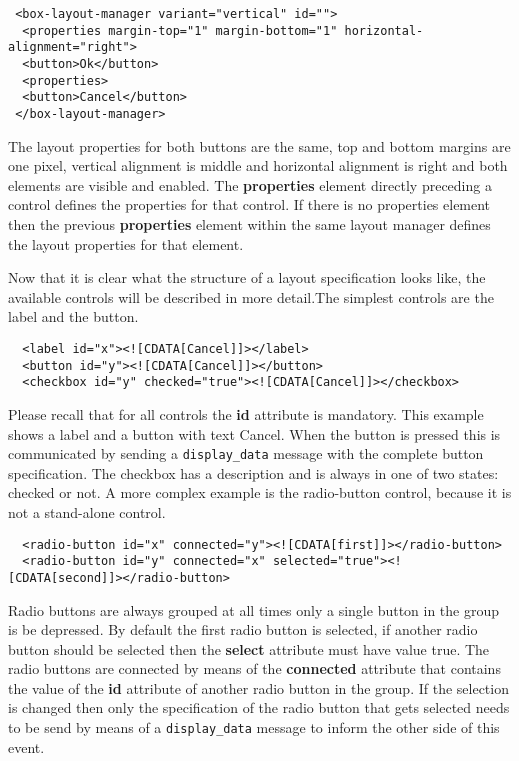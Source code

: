 \documentclass{article}
\newcommand{\msg}[1]{\texttt{#1}}
\begin{document}
    \begin{verbatim}
 <box-layout-manager variant="vertical" id="">
  <properties margin-top="1" margin-bottom="1" horizontal-alignment="right">
  <button>Ok</button>
  <properties>
  <button>Cancel</button>
 </box-layout-manager>\end{verbatim}

   The layout properties for both buttons are the same, top and bottom margins
   are one pixel, vertical alignment is middle and horizontal alignment is right
   and both elements are visible and enabled. The \textbf{properties} element
   directly preceding a control defines the properties for that control. If
   there is no properties element then the previous \textbf{properties} element
   within the same layout manager defines the layout properties for that
   element.

   Now that it is clear what the structure of a layout specification looks
   like, the available controls will be described in more detail.The simplest
   controls are the label and the button.

    \begin{verbatim}
  <label id="x"><![CDATA[Cancel]]></label>
  <button id="y"><![CDATA[Cancel]]></button>
  <checkbox id="y" checked="true"><![CDATA[Cancel]]></checkbox>\end{verbatim}

   Please recall that for all controls the \textbf{id} attribute is mandatory.
   This example shows a label and a button with text Cancel. When the button is
   pressed this is communicated by sending a \msg{display\_data} message with the
   complete button specification. The checkbox has a description and is always
   in one of two states: checked or not. A more complex example is the
   radio-button control, because it is not a stand-alone control.

    \begin{verbatim}
  <radio-button id="x" connected="y"><![CDATA[first]]></radio-button>
  <radio-button id="y" connected="x" selected="true"><![CDATA[second]]></radio-button>\end{verbatim}

   Radio buttons are always grouped at all times only a single button in the
   group is be depressed.  By default the first radio button is selected, if
   another radio button should be selected then the \textbf{select} attribute
   must have value true. The radio buttons are connected by means of the
   \textbf{connected} attribute that contains the value of the \textbf{id}
   attribute of another radio button in the group. If the selection is changed
   then only the specification of the radio button that gets selected needs to
   be send by means of a \msg{display\_data} message to inform the other side
   of this event.
\end{document}

